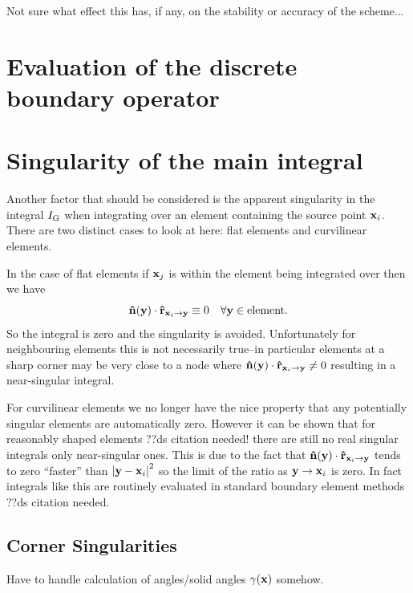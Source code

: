 Not sure what effect this has, if any, on the stability or accuracy of the scheme...

\section{Evaluation of the discrete boundary operator}
\label{sec:calc-integr-i_bm}

\section{Singularity of the main integral}
\label{sec:bem-singularity}

Another factor that should be considered is the apparent singularity in the integral $I_{\mathbf{\mathrm{G}}}$ when integrating over an element containing the source point $\mathbf{x}_{i}$. There are two distinct cases to look at here: flat elements and curvilinear elements.

In the case of flat elements if $\mathbf{x}_{j}$ is within the element being integrated over then we have
\begin{equation}
  \label{eq:7}
  \mathbf{\hat{n}}(\mathbf{y}) \cdot \mathbf{\hat{r}}_{\mathbf{x}_{{i}} \rightarrow \mathbf{y}} \equiv 0 \quad \forall \mathbf{y} \in \text{element}.
\end{equation}
So the integral is zero and the singularity is avoided. Unfortunately for neighbouring elements this is not necessarily true--in particular elements at a sharp corner may be very close to a node where $\mathbf{\hat{n}}(\mathbf{y}) \cdot \mathbf{\hat{r}}_{\mathbf{x}_{{i}} \rightarrow \mathbf{y}} \neq 0$ resulting in a near-singular integral.

For curvilinear elements we no longer have the nice property that any potentially singular elements are automatically zero. However it can be shown that for reasonably shaped elements ??ds citation needed! there are still no real singular integrals only near-singular ones. This is due to the fact that $\mathbf{\hat{n}}(\mathbf{y}) \cdot \mathbf{\hat{r}}_{\mathbf{x}_{{i}} \rightarrow \mathbf{y}}$ tends to zero ``faster'' than $\left|{\mathbf{y} - \mathbf{x}_{i}} \right|^2$ so the limit of the ratio as $\mathbf{y} \rightarrow \mathbf{x}_{i}$ is zero. In fact integrals like this are routinely evaluated in standard boundary element methods ??ds citation needed.


\subsection{Corner Singularities}

Have to handle calculation of angles/solid angles $\gamma(\mathbf{x})$ somehow.

